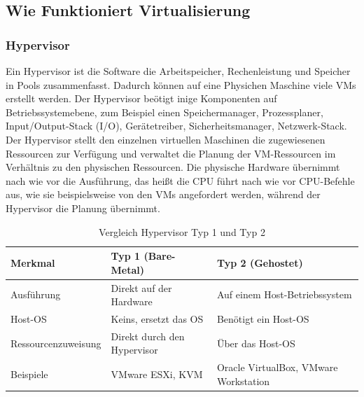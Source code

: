 \subsection{Wie Funktioniert Virtualisierung}
\subsubsection{Hypervisor}
Ein Hypervisor ist die Software die Arbeitspeicher, Rechenleistung und Speicher in Pools zusammenfasst. Dadurch können auf eine Physichen Maschine viele VMs erstellt werden. Der Hypervisor beötigt inige Komponenten auf Betriebssystemebene, zum Beispiel einen Speichermanager, Prozessplaner, Input/Output-Stack (I/O), Gerätetreiber, Sicherheitsmanager, Netzwerk-Stack. Der Hypervisor stellt den einzelnen virtuellen Maschinen die zugewiesenen Ressourcen zur Verfügung und verwaltet die Planung der VM-Ressourcen im Verhältnis zu den physischen Ressourcen. Die physische Hardware übernimmt nach wie vor die Ausführung, das heißt die CPU führt nach wie vor CPU-Befehle aus, wie sie beispielsweise von den VMs angefordert werden, während der Hypervisor die Planung übernimmt.

\begin{table}[h]
    \centering
    \begin{tabular}{|l|p{5cm}|p{5cm}|}
        \hline
        \textbf{Merkmal} & \textbf{Typ 1 (Bare-Metal)} & \textbf{Typ 2 (Gehostet)} \\
        \hline
        Ausführung & Direkt auf der Hardware & Auf einem Host-Betriebssystem \\
        \hline
        Host-OS & Keins, ersetzt das OS & Benötigt ein Host-OS \\
        \hline
        Ressourcenzuweisung & Direkt durch den Hypervisor & Über das Host-OS \\
        \hline
        Beispiele & VMware ESXi, KVM & Oracle VirtualBox, VMware Workstation \\
        \hline
    \end{tabular}
    \caption{Vergleich Hypervisor Typ 1 und Typ 2}
    \label{tab:hypervisor}
\end{table}